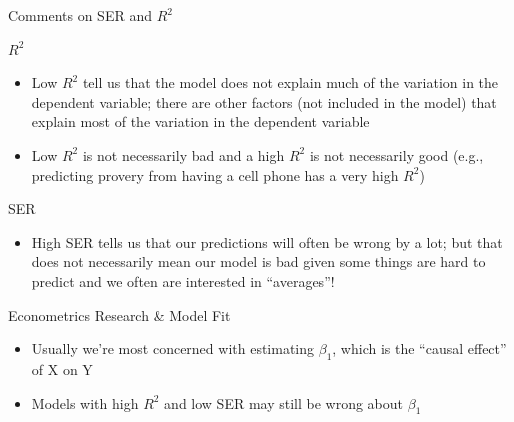 \documentclass[
  8pt,
  ignorenonframetext,
  dvipsnames]{beamer}
\providecommand{\tightlist}{%
  \setlength{\itemsep}{0pt}\setlength{\parskip}{0pt}}
\let\olditem\item
\renewcommand{\item}{%
  \olditem\vspace{4pt}
}
\begin{document}
\begin{frame}{Comments on SER and \(R^2\)}
\protect\hypertarget{comments-on-ser-and-r2}{}

\(R^2\)

\begin{itemize}
\tightlist
\item
  Low \(R^2\) tell us that the model does not explain much of the
  variation in the dependent variable; there are other factors (not
  included in the model) that explain most of the variation in the
  dependent variable
\item
  Low \(R^2\) is not necessarily bad and a high \(R^2\) is not
  necessarily good (e.g., predicting provery from having a cell phone
  has a very high \(R^2\))
\end{itemize}

\medskip

SER

\begin{itemize}
\tightlist
\item
  High SER tells us that our predictions will often be wrong by a lot;
  but that does not necessarily mean our model is bad given some things
  are hard to predict and we often are interested in ``averages''!
\end{itemize}

\medskip

Econometrics Research \& Model Fit

\begin{itemize}
\tightlist
\item
  Usually we're most concerned with estimating \(\beta_1\), which is the
  ``causal effect'' of X on Y
\item
  Models with high \(R^2\) and low SER may still be wrong about
  \(\beta_1\)
\end{itemize}

\end{frame}
\end{document}

